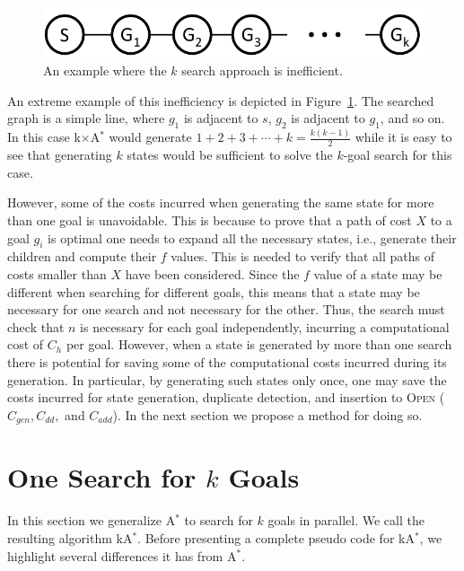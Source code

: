 \documentclass{aicom2e}
\newcommand{\kgs}{$k$-goal search}
\newcommand{\astar}{A$^*$}
\newcommand{\kastar}{kA$^*$}
\newcommand{\kxastar}{k$\times$A$^*$}
\newcommand{\open}{\textsc{Open}}
\begin{document}
\begin{figure}
	\includegraphics[width=\columnwidth]{k-search-bad_cropped}
	\caption{An example where the $k$ search approach is inefficient.}
	\label{fig:k-search-bad}
\end{figure}
An extreme example of this inefficiency is depicted in Figure~\ref{fig:k-search-bad}. The searched graph is a simple line, 
where $g_1$ is adjacent to $s$, $g_2$ is adjacent to $g_1$, and so on. In this case \kxastar{} would generate
$1+2+3+\cdots+k=\frac{k(k-1)}{2}$ while it is easy to see that generating $k$ states would be sufficient to solve the \kgs{} for this case. 


However, some of the costs incurred when generating the same state for more than one goal is unavoidable. 
This is because to prove that a path of cost $X$ to a goal $g_i$ is optimal one needs to expand all the necessary states, 
i.e., generate their children and compute their $f$ values. This is needed to verify that all paths of costs smaller than $X$ have been considered. Since the $f$ value of a state may be different when searching for different goals, this means that a state may be necessary for one search and not necessary for the other. 
Thus, the search must check that $n$ is necessary for each goal independently, incurring a computational cost of $C_{h}$ per goal. 
However, when a state is generated by more than one search there is potential for saving some of the computational costs incurred during its generation. In particular, by generating such states only once, one may save the costs incurred for state generation, duplicate detection, and insertion to \open{} ($C_{gen}, C_{dd},$ and $C_{add}$). In the next section we propose a method for doing so. 



\section{One Search for $k$ Goals}
\label{sec:one-k-goal-search}
In this section we generalize \astar{} to search for $k$ goals in parallel. 
We call the resulting algorithm \kastar{}. 
Before presenting a complete pseudo code for \kastar{}, we highlight several differences it has from \astar{}. 
\end{document}
